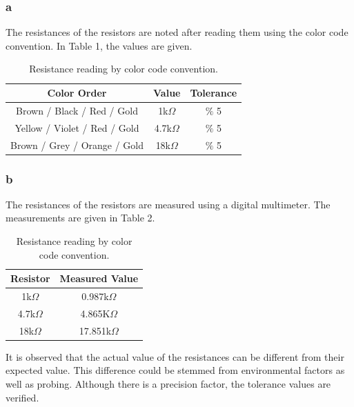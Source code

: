 \documentclass[letterpaper,12pt]{article}
\begin{document}
\subsubsection{a} 
The resistances of the resistors are noted after reading them using the color code convention. In Table 1, the values are given. 
\begin{table}[H]
\begin{center}
	\caption{Resistance reading by color code convention.}
	\vspace{2mm}
	\begin{tabular}{||c | c | c||} 
	 \hline
	 Color Order & Value & Tolerance \\ [0.5ex] 
	 \hline\hline
	 Brown / Black / Red / Gold & 1k\( \Omega \) & \( \% \) 5  \\ 
	 \hline
	 Yellow / Violet / Red / Gold & 4.7k\( \Omega \) & \( \% \) 5   \\
	 \hline
	 Brown / Grey / Orange / Gold & 18k\( \Omega \) & \( \% \) 5  \\ [1ex] 
	 \hline
	\end{tabular}
\end{center}
\end{table}

\subsubsection{b} 
The resistances of the resistors are measured using a digital multimeter. The measurements are given in Table 2.
\begin{table}[H]
	\begin{center}
		\caption{Resistance reading by color code convention.}
		\vspace{2mm}

		\begin{tabular}{||c | c ||} 
		 \hline
		 Resistor & Measured Value \\ [0.5ex] 
		 \hline\hline
		 1k\( \Omega \) & 0.987k\( \Omega \)  \\ 
		 \hline
	     4.7k\( \Omega \) & 4.865K\( \Omega \)   \\
		 \hline
		 18k\( \Omega \) & 17.851k\( \Omega \)  \\ [1ex] 
		 \hline
		\end{tabular}
	\end{center}
	\end{table}
	

It is observed that the actual value of the resistances can be different from their expected value. This difference could be stemmed from environmental factors as well as probing. Although there is a precision factor, the tolerance values are verified. 
\end{document}
